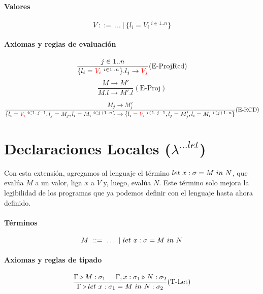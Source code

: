 \paragraph{Valores}
$$V~::=~\dots~|~\{l_i = V_i ~^{i\in 1..n}\}$$

\paragraph{Axiomas y reglas de evaluación}

\begin{equation*}
\frac{j\in 1..n}{\{l_i = \color{red}V_i\color{black} ~^{i\in 1..n}\}.l_j \to \color{red}V_j\color{black}}(\text{E-ProjRcd})
\end{equation*}
\vspace*{5mm}
\begin{equation*}
\frac{M \to M'}{M.l \to M'.l}(\text{E-Proj})
\end{equation*}

\vspace*{5mm}
\begin{equation*}
\frac{M_j\to M_j'}{\{l_i = \color{red}V_i\color{black}~^{i\in 1..j-1}, l_j = M_j, l_i = M_i ~^{i\in j+1..n}\} \to \{l_i = \color{red}V_i\color{black}~^{i\in 1..j-1}, l_j = M'_j, l_i = M_i ~^{i\in j+1..n}\}}(\text{E-RCD})
\end{equation*}
\vspace*{5mm}
\section{Declaraciones Locales (\texorpdfstring{$\lambda^{...let}$}{lambda ...let})}\label{extension_lambda:let}

Con esta extensión, agregamos al lenguaje el término $let~x:\sigma = M~in~N$, que evalúa $M$ a un valor, liga $x$ a $V$ y, luego, evalúa $N$. Este término solo mejora la legibilidad de los programas que ya podemos definir con el lenguaje hasta ahora definido.

\paragraph{Términos}
$$ M~::=~ \dots~|~let~x:\sigma = M~in~N $$


\paragraph{Axiomas y reglas de tipado}
\begin{equation*}
\frac{\Gamma\triangleright M : \sigma_1\hspace*{5mm}\Gamma,x:\sigma_1\triangleright N : \sigma_2}{\Gamma\triangleright let~x:\sigma_1 = M~in~N : \sigma_2}(\text{T-Let})
\end{equation*}

